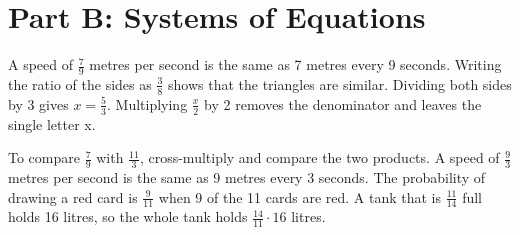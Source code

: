 \documentclass[11pt]{article}
\begin{document}
\section*{Part B: Systems of Equations}
A speed of \label{eq028}$\frac{7}{9}$ metres per second is the same as 7 metres every 9 seconds. Writing the ratio of the sides as \label{eq029}$\frac{3}{8}$ shows that the triangles are similar. Dividing both sides by 3 gives \label{eq030}$x = \frac{5}{3}$. Multiplying \label{eq031}$\frac{x}{2}$ by 2 removes the denominator and leaves the single letter x.

To compare \label{eq032}$\frac{7}{9}$ with \label{eq033}$\frac{11}{3}$, cross-multiply and compare the two products. A speed of \label{eq034}$\frac{9}{3}$ metres per second is the same as 9 metres every 3 seconds. The probability of drawing a red card is \label{eq035}$\frac{9}{11}$ when 9 of the 11 cards are red. A tank that is \label{eq036}$\frac{11}{14}$ full holds 16 litres, so the whole tank holds \label{eq037}$\frac{14}{11} \cdot 16$ litres.
\end{document}
